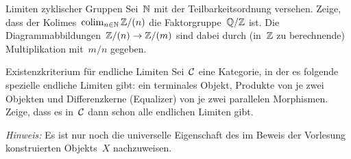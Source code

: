 \documentclass{uebblatt}
\begin{document}

\begin{aufgabe}{Limiten zyklischer Gruppen}
Sei~$\mathbb{N}$ mit der Teilbarkeitsordnung versehen. Zeige, dass
der Kolimes~$\operatorname{colim}_{n \in \mathbb{N}} \mathbb{Z}/(n)$ die Faktorgruppe~$\mathbb{Q}/\mathbb{Z}$ ist. Die
Diagrammabbildungen~$\mathbb{Z}/(n) \to \mathbb{Z}/(m)$ sind dabei durch (in~$\mathbb{Z}$ zu
berechnende) Multiplikation mit~$m/n$ gegeben.
\end{aufgabe}

\begin{aufgabe}{Existenzkriterium für endliche Limiten}
Sei~$\mathcal{C}$ eine Kategorie, in der es folgende spezielle endliche Limiten gibt:
ein terminales Objekt, Produkte von je zwei Objekten und Differenzkerne
(Equalizer) von je zwei parallelen Morphismen. Zeige, dass es in~$\mathcal{C}$
dann schon alle endlichen Limiten gibt.

\emph{Hinweis:} Es ist nur noch die universelle Eigenschaft des im Beweis der
Vorlesung konstruierten Objekts~$X$ nachzuweisen.
\end{aufgabe}
\end{document}
